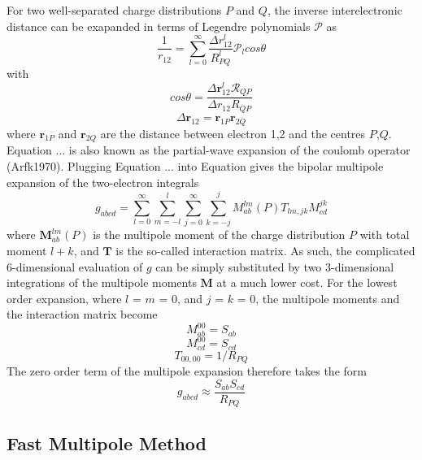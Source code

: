 For two well-separated charge distributions $P$ and $Q$, the inverse interelectronic distance can be exapanded in terms of Legendre polynomials $\mathcal{P}$ as
\begin{equation}
\frac{1}{r_{12}} = \sum_{l=0}^{\infty} \frac{\Delta r_{12}^l}{R_{PQ}^l} \mathcal{P}_{l} cos \theta
\end{equation}
\noindent with 
\begin{equation}
cos \theta = \frac{\Delta \mathbf{r}_{12}^l \mathcal{R}_{QP}}{\Delta r_{12} R_{QP}} 
\end{equation}
\begin{equation}
\Delta \mathbf{r}_{12} = \mathbf{r}_{1P} \mathbf{r}_{2Q}
\end{equation}
\noindent where $\mathbf{r}_{1P}$ and $\mathbf{r}_{2Q}$ are the distance between electron 1,2 and the centres $P$,$Q$. Equation ... is also known as the partial-wave expansion of the coulomb operator (Arfk1970). Plugging Equation ... into Equation gives the bipolar multipole expansion of the two-electron integrals
\begin{equation}
g_{abcd} = \sum_{l=0}^{\infty} \sum_{m=-l}^l \sum_{j=0}^{\infty} \sum_{k=-j}^{j} M_{ab}^{lm}(P) T_{lm,jk} M_{cd}^{jk}
\end{equation}
\noindent where $\mathbf{M}_{ab}^{lm}(P)$ is the multipole moment of the charge distribution $P$ with total moment $l+k$, and $\mathbf{T}$ is the so-called interaction matrix. As such, the complicated 6-dimensional evaluation of $g$ can be simply substituted by two 3-dimensional integrations of the multipole moments $\mathbf{M}$ at a much lower cost. For the lowest order expansion, where $l$ = $m$ = 0, and $j$ = $k$ = 0, the multipole moments and the interaction matrix become 
\begin{equation}
M_{ab}^{00} = S_{ab}
\end{equation}
\begin{equation}
M_{cd}^{00} = S_{cd}
\end{equation}
\begin{equation}
T_{00,00} = 1/R_{PQ}
\end{equation}
\noindent The zero order term of the multipole expansion therefore takes the form
\begin{equation}
g_{abcd} \approx \frac{S_{ab}S_{cd}}{R_{PQ}}
\end{equation}

\subsection{Fast Multipole Method}

